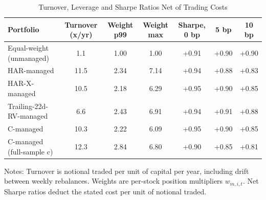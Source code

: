 
\begin{table}[htbp]
\centering
\caption{Turnover, Leverage and Sharpe Ratios Net of Trading Costs}
\label{tab:costs}
\small
\begin{tabular}{lcccccc}
\toprule
Portfolio & Turnover (x/yr) & Weight p99 & Weight max & Sharpe, 0 bp & 5 bp & 10 bp \\
\midrule
Equal-weight (unmanaged) & 1.1 & 1.00 & 1.00 & +0.91 & +0.90 & +0.90 \\
HAR-managed & 11.5 & 2.34 & 7.14 & +0.94 & +0.88 & +0.83 \\
HAR-X-managed & 10.5 & 2.18 & 6.29 & +0.95 & +0.90 & +0.85 \\
Trailing-22d-RV-managed & 6.6 & 2.43 & 6.91 & +0.94 & +0.91 & +0.88 \\
C-managed & 10.3 & 2.22 & 6.09 & +0.95 & +0.90 & +0.85 \\
C-managed (full-sample c) & 12.3 & 2.84 & 6.80 & +0.90 & +0.85 & +0.81 \\
\bottomrule
\end{tabular}
\begin{tablenotes}\small
\item Notes: Turnover is notional traded per unit of capital per year, including drift between weekly rebalances. Weights are per-stock position multipliers $w_{m,i,t}$. Net Sharpe ratios deduct the stated cost per unit of notional traded.
\end{tablenotes}
\end{table}
